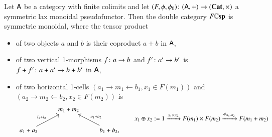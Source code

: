 \documentclass[reqno]{amsart}
\begin{document}
\begin{thm}\label{DC}
Let $\mathsf{A}$ be a category with finite colimits and let $(F,\phi,\phi_0)\colon (\mathsf{A},+) \to (\mathbf{Cat},\times)$ a symmetric lax monoidal pseudofunctor. Then the double category $F\mathbf{\mathbb Csp}$ is symmetric monoidal, where the tensor product
\begin{itemize}
\item of two objects $a$ and $b$ is their coproduct $a+b$ in $\mathsf{A}$,
\item of two vertical 1-morphisms $f \colon a \to b$ and $f' \colon a' \to b'$ is $f+f' \colon a+a' \to b+b'$ in $\mathsf{A}$,
\item of two horizontal 1-cells $(a_1\to m_1\leftarrow b_1,x_1\in F(m_1))$ and $(a_2\to m_2\leftarrow b_2,x_2\in F(m_2))$ is 
\begin{equation}\label{eq:tensordecoration}
\begin{tikzcd}
& m_1+m_2 & \\
a_1+a_2\ar[ur,"i_1+i_2"] && b_1+b_2,\ar[ul,"o_1+o_2"']
\end{tikzcd}\qquad x_1\oplus x_2:=1\xrightarrow{x_1\times x_2}F(m_1)\times F(m_2)\xrightarrow{\phi_{m_1,m_2}}F(m_1+m_2)
\end{equation}


\end{itemize}
\end{thm}
\end{document}
